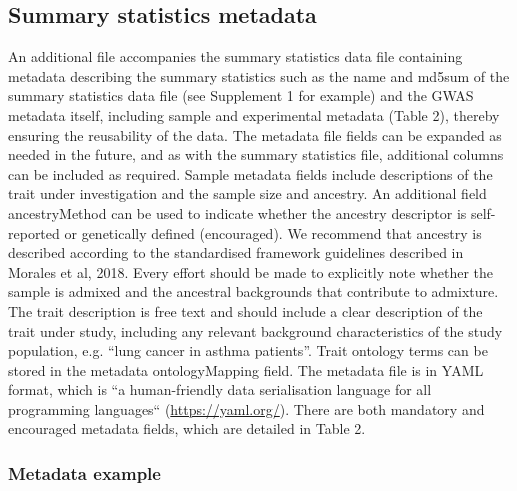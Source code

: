 \documentclass[11pt]{article}
\begin{document}
\subsection{Summary statistics metadata}
An additional file accompanies the summary statistics data file containing metadata describing the summary statistics such as the name and md5sum of the summary statistics data file (see Supplement 1 for example) and the GWAS metadata itself, including sample and experimental metadata (Table 2),  thereby ensuring the reusability of the data. The metadata file fields can be expanded as needed in the future, and as with the summary statistics file, additional columns can be included as required. Sample metadata fields include descriptions of the trait under investigation and the sample size and ancestry. An additional field ancestryMethod can be used to indicate whether the ancestry descriptor is self-reported or genetically defined (encouraged). We recommend that ancestry is described according to the standardised framework guidelines described in Morales et al, 2018. Every effort should be made to explicitly note whether the sample is admixed and the ancestral backgrounds that contribute to admixture. The trait description is free text and should include a clear description of the trait under study, including any relevant background characteristics of the study population, e.g. “lung cancer in asthma patients”. Trait ontology terms can be stored in the metadata ontologyMapping field. The metadata file is in YAML format, which is “a human-friendly data serialisation language for all programming languages“ (\url{https://yaml.org/}). There are both mandatory and encouraged metadata fields, which are detailed in Table 2. 


\subsubsection{Metadata example}


\end{document}
